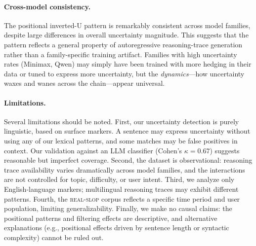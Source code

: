 \paragraph{Cross-model consistency.}
The positional inverted-U pattern is remarkably consistent across model families, despite large differences in overall uncertainty magnitude. This suggests that the pattern reflects a general property of autoregressive reasoning-trace generation rather than a family-specific training artifact. Families with high uncertainty rates (Minimax, Qwen) may simply have been trained with more hedging in their data or tuned to express more uncertainty, but the \emph{dynamics}---how uncertainty waxes and wanes across the chain---appear universal.

\paragraph{Limitations.}
Several limitations should be noted. First, our uncertainty detection is purely linguistic, based on surface markers. A sentence may express uncertainty without using any of our lexical patterns, and some matches may be false positives in context. Our validation against an LLM classifier (Cohen's $\kappa = 0.67$) suggests reasonable but imperfect coverage. Second, the dataset is observational: reasoning trace availability varies dramatically across model families, and the interactions are not controlled for topic, difficulty, or user intent. Third, we analyze only English-language markers; multilingual reasoning traces may exhibit different patterns. Fourth, the \textsc{real-slop} corpus reflects a specific time period and user population, limiting generalizability. Finally, we make no causal claims: the positional patterns and filtering effects are descriptive, and alternative explanations (e.g., positional effects driven by sentence length or syntactic complexity) cannot be ruled out.
